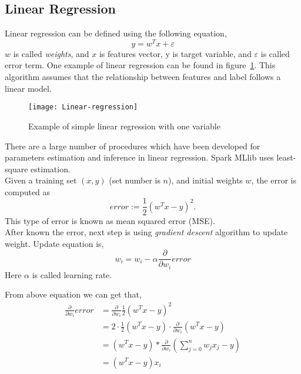 \subsection{Linear Regression}
Linear regression can be defined using the following equation,
\begin{equation}
	y=w^Tx + \varepsilon
\end{equation}
$ w $ is called \emph{weights}, and $ x $ is features vector, y is target variable, and $ \varepsilon $ is called error term. One example of linear regression can be found in figure~\ref{fg:linear_regression}. This algorithm assumes that the relationship between features and label follows a linear model.
\begin{figure}[h]
	\centering
	\texttt{[image: Linear-regression]}
	\caption{Example of simple linear regression with one variable}
	\label{fg:linear_regression}
\end{figure}


There are a large number of procedures which have been developed for parameters estimation and inference in linear regression. Spark MLlib uses least-square estimation\cite{7_mllib_linear_methods}.\\


Given a training set $ (x, y) $ (set number is $ n $), and initial weights $ w $, the error is computed as
\begin{equation}
error := \frac{1}{2} (w^T x - y)^2.
\label{eq:error_equation}
\end{equation}
This type of error is known as mean squared error (MSE).\\


After known the error, next step is using \emph{gradient descent} algorithm to update weight. Update equation is,
\begin{equation}
w_i=w_i-\alpha \frac{\partial}{\partial w_i} error
\label{eq:update_equation}
\end{equation}
Here $ \alpha $ is called learning rate. 


From above equation we can get that,
\begin{equation}
\begin{split}
\frac{\partial }{\partial w_i} error & = \frac{\partial }{\partial w_i} \frac{1}{2}(w^Tx-y)^2\\
& = 2 \cdot \frac{1}{2} (w^Tx-y) \cdot \frac{\partial }{\partial w_i} (w^Tx-y)\\
& = (w^Tx-y) * \frac{\partial }{\partial w_i} (\sum_{j=0}^{n}w_j x_j - y)\\
& = (w^Tx-y)x_i
\end{split}
\label{eq:partil_error}
\end{equation}


